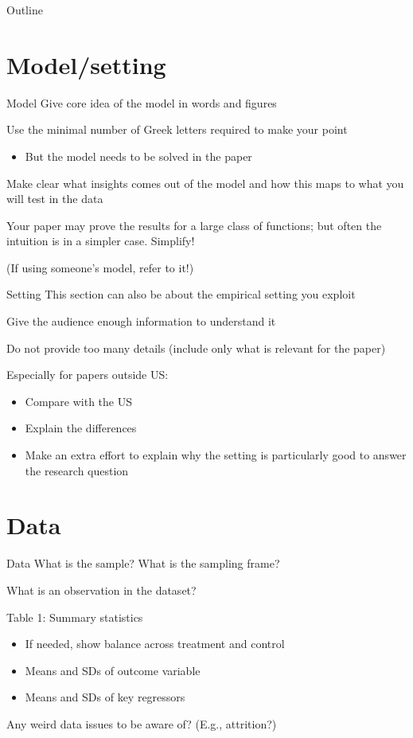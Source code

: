 \documentclass[aspectratio=169, 11pt]{beamer}
\newcommand{\ToCslide}{\bgroup\setbeamertemplate{footline}{}%
\addtocounter{framenumber}{-1}%
\begin{frame}{Outline}%
\tableofcontents%
\end{frame}\egroup}
\begin{document}
\ToCslide

\section{Model/setting}

\begin{frame}{Model}
    Give core idea of the model in words and figures
    
    Use the minimal number of Greek letters required to make your point\\
    \begin{itemize}
        \item But the model needs to be solved in the paper
    \end{itemize}
    
    Make clear what insights comes out of the model and how this maps to what you will test in the data
    
    Your paper may prove the results for a large class of functions; but often the intuition is in a simpler case. Simplify!
    
    \small (If using someone's model, refer to it!)
\end{frame}

\begin{frame}{Setting}
    This section can also be about the empirical setting you exploit
    
    Give the audience enough information to understand it
    
    Do not provide too many details (include only what is relevant for the paper)
    
    Especially for papers outside US:
    \begin{itemize}
        \item Compare with the US
        \item Explain the differences
        \item Make an extra effort to explain why the setting is particularly good to answer the research question
    \end{itemize}
\end{frame}

\section{Data}

\begin{frame}{Data}
    What is the sample? What is the sampling frame?
    
    What is an observation in the dataset?
    
    Table 1: Summary statistics\\
    \begin{itemize}
        \item If needed, show balance across treatment and control
        \item Means and SDs of outcome variable
        \item Means and SDs of key regressors
    \end{itemize}
    
    Any weird data issues to be aware of? (E.g., attrition?)
\end{frame}
\end{document}
